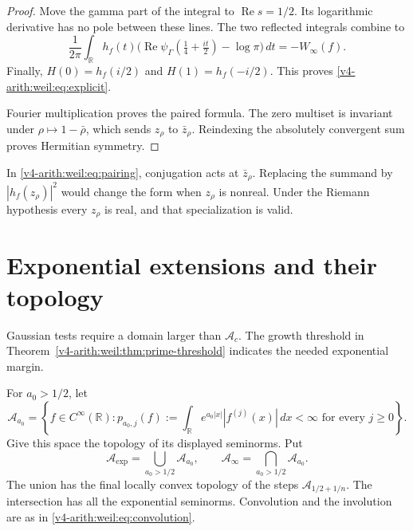 \begin{proof}
Move the gamma part of the integral to \(\operatorname{Re}s=1/2\).
Its logarithmic derivative has no pole between these lines.
The two reflected integrals combine to
\[
 \frac1{2\pi}\int_{\mathbb R}h_f(t)
       \bigl(\operatorname{Re}\psi_\Gamma(\tfrac14+\tfrac{it}{2})
                     -\log\pi\bigr)\,dt=-W_\infty(f).
\]
Finally, \(H(0)=h_f(i/2)\) and \(H(1)=h_f(-i/2)\).
This proves \eqref{v4-arith:weil:eq:explicit}.

Fourier multiplication proves the paired formula.
The zero multiset is invariant under
\(\rho\mapsto1-\bar\rho\), which sends \(z_\rho\) to \(\bar z_\rho\).
Reindexing the absolutely convergent sum proves Hermitian symmetry.
\end{proof}

In \eqref{v4-arith:weil:eq:pairing}, conjugation acts at
\(\bar z_\rho\). Replacing the summand by \(|h_f(z_\rho)|^2\)
would change the form when \(z_\rho\) is nonreal.
Under the Riemann hypothesis every \(z_\rho\) is real, and that
specialization is valid.

\section{Exponential extensions and their topology}
\label{v4-arith:weil:exponential}

Gaussian tests require a domain larger than \(\mathscr A_c\).
The growth threshold in Theorem~\ref{v4-arith:weil:thm:prime-threshold}
indicates the needed exponential margin.

\begin{definition}
\label{v4-arith:weil:def:exponential}
For \(a_0>1/2\), let
\begin{equation}
 \mathscr A_{a_0}=
 \left\{f\in C^\infty(\mathbb R):
 p_{a_0,j}(f):=\int_{\mathbb R}
          e^{a_0|x|}|f^{(j)}(x)|\,dx<\infty
          \text{ for every }j\ge0\right\}.
 \label{v4-arith:weil:eq:exponential}
\end{equation}
Give this space the topology of its displayed seminorms.
Put
\[
 \mathscr A_{\exp}=\bigcup_{a_0>1/2}\mathscr A_{a_0},\qquad
 \mathscr A_\infty=\bigcap_{a_0>1/2}\mathscr A_{a_0}.
\]
The union has the final locally convex topology of the steps
\(\mathscr A_{1/2+1/n}\). The intersection has all the exponential
seminorms. Convolution and the involution are as in
\eqref{v4-arith:weil:eq:convolution}.
\end{definition}

